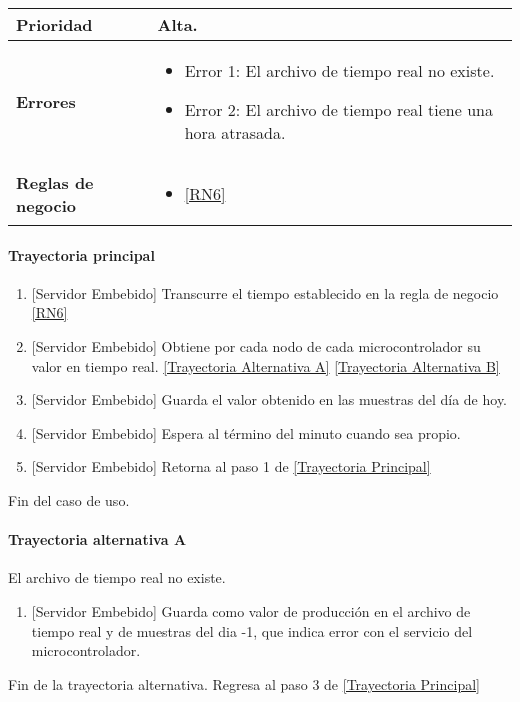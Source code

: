 \begin{longtable}{|J{5cm}|J{10.3cm}|}
	\textbf{Prioridad} & 
		Alta. \\ \hline
	\textbf{Errores} &
		 \begin{itemize}
		 	\item \label{SUB-M-CU1.5:Error1} Error 1: El archivo de tiempo real no existe.
		 	\item \label{SUB-M-CU1.5:Error2} Error 2: El archivo de tiempo real tiene una hora atrasada.
		 \end{itemize} \\ \hline
	\textbf{Reglas de negocio} & 
	    \begin{itemize}
	      \item  \ref{RN6}
		 \end{itemize}\\ \hline
\end{longtable}

\paragraph{Trayectoria principal}
\label{SUB-M-CU1.5:TP}
	\begin{enumerate}
	    \item {[Servidor Embebido]} Transcurre el tiempo establecido en la regla de negocio \ref{RN6}
	    \item {[Servidor Embebido]} Obtiene por cada nodo de cada microcontrolador su valor en tiempo real. \hyperref[SUB-M-CU1.5:TB]{[Trayectoria Alternativa A]} \hyperref[SUB-M-CU1.5:TB]{[Trayectoria Alternativa B]}
	    \item {[Servidor Embebido]} Guarda el valor obtenido en las muestras del día de hoy.
	    \item {[Servidor Embebido]} Espera al término del minuto cuando sea propio.
		\item {[Servidor Embebido]} Retorna al paso 1 de \hyperref[SUB-M-CU1.5:TP]{[Trayectoria Principal]}
	\end{enumerate}
	Fin del caso de uso.

\paragraph{Trayectoria alternativa A} \label{SUB-M-CU1.5:TA}
	El archivo de tiempo real no existe.
	\begin{enumerate}[label=A\arabic*.]
		\item {[Servidor Embebido]} Guarda como valor de producción en el archivo de tiempo real y de muestras del dia -1, que indica error con el servicio del microcontrolador.
	\end{enumerate}
	Fin de la trayectoria alternativa. Regresa al paso 3 de \hyperref[SUB-M-CU1.5:TP]{[Trayectoria Principal]}  

